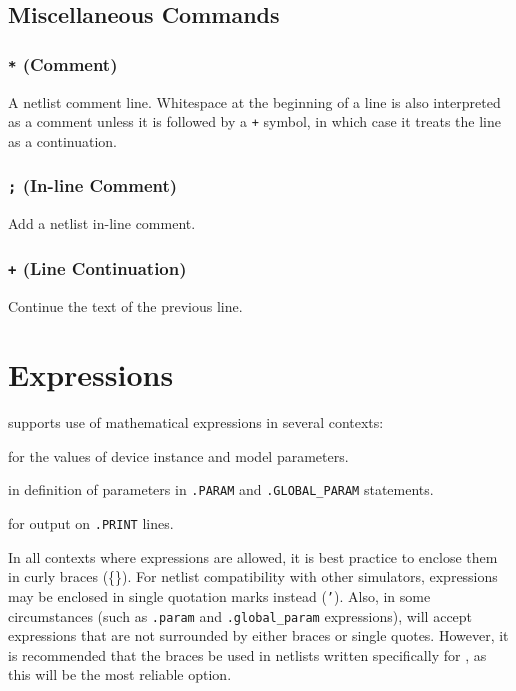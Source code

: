 \newpage
\subsection{Miscellaneous Commands}
\subsubsection{\texttt{*} (Comment)}
 A netlist comment line.  Whitespace at
the beginning of a line is also interpreted as a comment unless it
is followed by a \verb|+| symbol, in which case it treats the line as a continuation.

\subsubsection{\texttt{;} (In-line Comment)}
 Add a netlist in-line comment.

\subsubsection{\texttt{+} (Line Continuation)}
 Continue the text of the previous line.

\newpage
\section{Expressions}
\label{ExpressionDocumentation}
\Xyce{} supports use of mathematical expressions in several contexts:
\begin{XyceItemize}
\item for the values of device instance and model parameters.
\item in definition of parameters in \texttt{.PARAM} and \texttt{.GLOBAL\_PARAM} statements.
\item for output on \texttt{.PRINT} lines.
\end{XyceItemize}

In all contexts where expressions are allowed, it is best practice to enclose them
in curly braces (\{\}).  For netlist compatibility with other simulators,
expressions may be enclosed in single quotation marks instead (\texttt{'}). Also, in
some circumstances (such as \texttt{.param} and \texttt{.global\_param} expressions), \Xyce{} will accept 
expressions that are not surrounded by either braces or single quotes. 
However, it is recommended that the braces be used in netlists written specifically for \Xyce{}, as this will
be the most reliable option.

